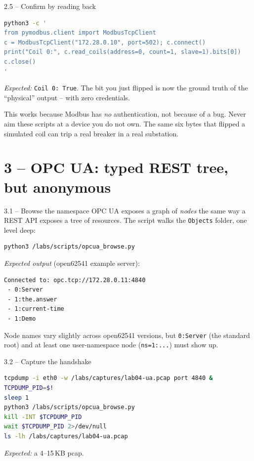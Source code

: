 \documentclass[11pt,a4paper]{article}
\begin{document}
\begin{stepbox}{2.5 -- Confirm by reading back}
\begin{lstlisting}[language=bash]
python3 -c '
from pymodbus.client import ModbusTcpClient
c = ModbusTcpClient("172.28.0.10", port=502); c.connect()
print("Coil 0:", c.read_coils(address=0, count=1, slave=1).bits[0])
c.close()
'
\end{lstlisting}
\emph{Expected:} \texttt{Coil 0: True}. The bit you just flipped is now
the ground truth of the ``physical'' output -- with zero credentials.
\end{stepbox}

\begin{warnbox}
This works because Modbus has \emph{no} authentication, not because of a
bug. Never aim these scripts at a device you do not own. The same six
bytes that flipped a simulated coil can trip a real breaker in a real
substation.
\end{warnbox}

\section*{3 -- OPC UA: typed REST tree, but anonymous}

\begin{stepbox}{3.1 -- Browse the namespace}
OPC UA exposes a graph of \emph{nodes} the same way a REST API exposes a
tree of resources. The script walks the \texttt{Objects} folder, one
level deep:
\begin{lstlisting}[language=bash]
python3 /labs/scripts/opcua_browse.py
\end{lstlisting}
\emph{Expected output} (open62541 example server):
\begin{lstlisting}
Connected to: opc.tcp://172.28.0.11:4840
 - 0:Server
 - 1:the.answer
 - 1:current-time
 - 1:Demo
\end{lstlisting}
Node names vary slightly across open62541 versions, but \texttt{0:Server}
(the standard root) and at least one user-namespace node
(\texttt{ns=1:...}) must show up.
\end{stepbox}

\begin{stepbox}{3.2 -- Capture the handshake}
\begin{lstlisting}[language=bash]
tcpdump -i eth0 -w /labs/captures/lab04-ua.pcap port 4840 &
TCPDUMP_PID=$!
sleep 1
python3 /labs/scripts/opcua_browse.py
kill -INT $TCPDUMP_PID
wait $TCPDUMP_PID 2>/dev/null
ls -lh /labs/captures/lab04-ua.pcap
\end{lstlisting}
\emph{Expected:} a 4--15\,KB pcap.
\end{stepbox}
\end{document}
